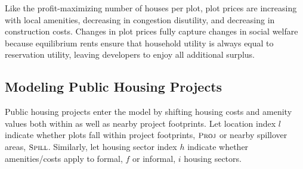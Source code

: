 \documentclass[12pt]{article}
\begin{document}
Like the profit-maximizing number of houses per plot, plot prices are increasing with local amenities, decreasing in congestion disutility, and decreasing in construction costs.  Changes in plot prices fully capture changes in social welfare because equilibrium rents ensure that household utility is always equal to reservation utility, leaving developers to enjoy all additional surplus. 









\subsection{Modeling Public Housing Projects}

Public housing projects enter the model by shifting housing costs and amenity values both within as well as nearby project footprints.  Let location index $l$ indicate whether plots fall within project footprints, $\textsc{\small Proj}$ or nearby spillover areas, $\textsc{\small Spill}$.  Similarly, let housing sector index $h$ indicate whether amenities/costs apply to formal, $f$ or informal, $i$ housing sectors.
\end{document}

